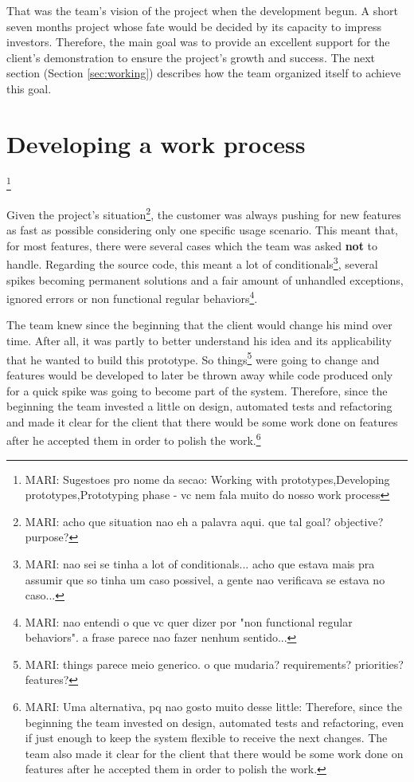 \documentclass[lnbip]{svmultln}
\newcommand{\mari}[1]{\footnote{MARI: #1}}
\begin{document}
That was the team's vision of the project when the development
begun. A short seven months project whose fate would be decided by its
capacity to impress investors. Therefore, the main goal was to provide
an excellent support for the client's demonstration to ensure the
project's growth and success. The next section (Section
\ref{sec:working}) describes how the team organized itself to achieve
this goal.

\section{Developing a work process}\mari{Sugestoes pro nome da secao:
  Working with prototypes,Developing prototypes,Prototyping phase - vc
  nem fala muito do nosso work process}
\label{sec:working}

Given the project's situation\mari{acho que situation nao eh a palavra
  aqui. que tal goal? objective? purpose?}, the customer was always
pushing for new features as fast as possible considering only one
specific usage scenario. This meant that, for most features, there
were several cases which the team was asked \textbf{not} to
handle. Regarding the source code, this meant a lot of
conditionals\mari{nao sei se tinha a lot of conditionals... acho que
  estava mais pra assumir que so tinha um caso possivel, a gente nao
  verificava se estava no caso...}, several spikes becoming permanent
solutions and a fair amount of unhandled exceptions, ignored errors or
non functional regular behaviors\mari{nao entendi o que vc quer dizer
  por "non functional regular behaviors". a frase parece nao fazer
  nenhum sentido...}.

The team knew since the beginning that the client would change his
mind over time. After all, it was partly to better understand his idea
and its applicability that he wanted to build this prototype. So
things\mari{things parece meio generico. o que mudaria? requirements?
  priorities? features?} were going to change and features would be
developed to later be thrown away while code produced only for a quick
spike was going to become part of the system. Therefore, since the
beginning the team invested a little on design, automated tests and
refactoring and made it clear for the client that there would be some
work done on features after he accepted them in order to polish the
work.\mari{Uma alternativa, pq nao gosto muito desse little:
  Therefore, since the beginning the team invested on design,
  automated tests and refactoring, even if just enough to keep the
  system flexible to receive the next changes. The team also made it
  clear for the client that there would be some work done on features
  after he accepted them in order to polish the work.}
\end{document}
